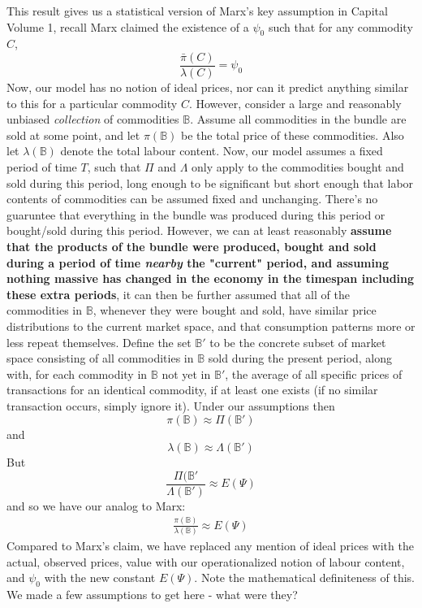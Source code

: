 This result gives us a statistical version of Marx's key assumption in Capital Volume 1, recall Marx claimed the existence of a $\psi_0$ such that for any commodity $C$, 
	\[ \frac{\bar{\pi}(C)}{\lambda(C)} = \psi_0 \]
Now, our model has no notion of ideal prices, nor can it predict anything similar to this for a particular commodity $C$. However, consider a large and reasonably unbiased \textit{collection} of commodities $\mathbb{B}$. Assume all commodities in the bundle are sold at some point, and let $\pi(\mathbb{B})$ be the total price of these commodities. Also let $\lambda(\mathbb{B})$ denote the total labour content. Now, our model assumes a fixed period of time $T$, such that $\Pi$ and $\Lambda$ only apply to the commodities bought and sold during this period, long enough to be significant but short enough that labor contents of commodities can be assumed fixed and unchanging. There's no guaruntee that everything in the bundle was produced during this period or bought/sold during this period. However, we can at least reasonably \textbf{assume that the products of the bundle were produced, bought and sold during a period of time \textit{nearby} the "current" period, and assuming nothing massive has changed in the economy in the timespan including these extra periods}, it can then be further assumed that all of the commodities in $\mathbb{B}$, whenever they were bought and sold, have similar price distributions to the current market space, and that consumption patterns more or less repeat themselves. Define the set $\mathbb{B}'$ to be the concrete subset of market space consisting of all commodities in $\mathbb{B}$ sold during the present period, along with, for each commodity in $\mathbb{B}$ not yet in $\mathbb{B}'$, the average of all specific prices of transactions for an identical commodity, if at least one exists (if no similar transaction occurs, simply ignore it). Under our assumptions then  
\[ \pi(\mathbb{B}) \approx \Pi(\mathbb{B}') \] 
and
\[ \lambda(\mathbb{B}) \approx \Lambda(\mathbb{B}') \]
But 
\[ \frac{\Pi(\mathbb{B}'}{\Lambda(\mathbb{B}')} \approx E(\Psi) \]
and so we have our analog to Marx:
\begin{align}
	\frac{\pi(\mathbb{B})}{\lambda(\mathbb{B})} \approx E(\Psi)
\end{align}
Compared to Marx's claim, we have replaced any mention of ideal prices with the actual, observed prices, value with our operationalized notion of labour content, and $\psi_0$ with the new constant $E(\Psi)$. Note the mathematical definiteness of this. We made a few assumptions to get here - what were they?
